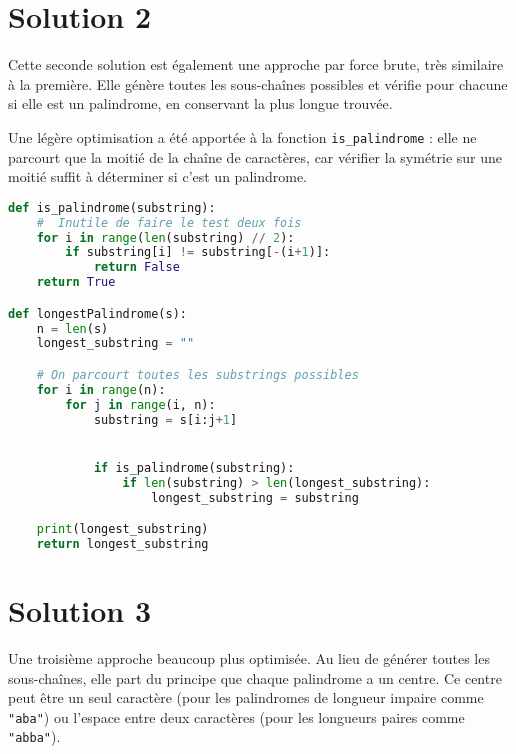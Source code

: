 \documentclass[12pt, a4paper]{article}
\begin{document}
\section*{Solution 2}

Cette seconde solution est également une approche par force brute, très similaire à la première. Elle génère toutes les sous-chaînes possibles et vérifie pour chacune si elle est un palindrome, en conservant la plus longue trouvée.

Une légère optimisation a été apportée à la fonction \texttt{is\_palindrome} : elle ne parcourt que la moitié de la chaîne de caractères, car vérifier la symétrie sur une moitié suffit à déterminer si c'est un palindrome.
\vspace{2mm}
\begin{lstlisting}[language=Python, label={code:palindrome2}]
def is_palindrome(substring):
    #  Inutile de faire le test deux fois
    for i in range(len(substring) // 2):
        if substring[i] != substring[-(i+1)]:
            return False
    return True

def longestPalindrome(s):
    n = len(s)
    longest_substring = ""

    # On parcourt toutes les substrings possibles
    for i in range(n):
        for j in range(i, n):
            substring = s[i:j+1]


            if is_palindrome(substring):
                if len(substring) > len(longest_substring):
                    longest_substring = substring

    print(longest_substring)
    return longest_substring
\end{lstlisting}
\newpage
\section*{Solution 3}

Une troisième approche beaucoup plus optimisée. Au lieu de générer toutes les sous-chaînes, elle part du principe que chaque palindrome a un centre. Ce centre peut être un seul caractère (pour les palindromes de longueur impaire comme \texttt{"aba"}) ou l'espace entre deux caractères (pour les longueurs paires comme \texttt{"abba"}).
\end{document}
